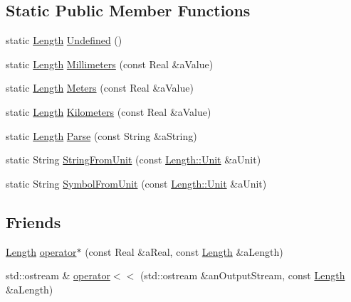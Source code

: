 \subsection*{Static Public Member Functions}
\begin{DoxyCompactItemize}
\item 
static \hyperlink{classlibrary_1_1physics_1_1units_1_1_length}{Length} \hyperlink{classlibrary_1_1physics_1_1units_1_1_length_a5dc80bc442d377701cf052c5bd27bef6}{Undefined} ()
\item 
static \hyperlink{classlibrary_1_1physics_1_1units_1_1_length}{Length} \hyperlink{classlibrary_1_1physics_1_1units_1_1_length_a291b337e409be3e9a13fa697867eb5c8}{Millimeters} (const Real \&a\+Value)
\item 
static \hyperlink{classlibrary_1_1physics_1_1units_1_1_length}{Length} \hyperlink{classlibrary_1_1physics_1_1units_1_1_length_ad523a3737d5c3f23a64588eac83f2148}{Meters} (const Real \&a\+Value)
\item 
static \hyperlink{classlibrary_1_1physics_1_1units_1_1_length}{Length} \hyperlink{classlibrary_1_1physics_1_1units_1_1_length_a28e457b910a96d1eb2bdf661d815478a}{Kilometers} (const Real \&a\+Value)
\item 
static \hyperlink{classlibrary_1_1physics_1_1units_1_1_length}{Length} \hyperlink{classlibrary_1_1physics_1_1units_1_1_length_af4bf5addf6b3936ef7c6cbd3fdca5bb3}{Parse} (const String \&a\+String)
\item 
static String \hyperlink{classlibrary_1_1physics_1_1units_1_1_length_a2e5796c1a5f36b168cd0ddaa03381299}{String\+From\+Unit} (const \hyperlink{classlibrary_1_1physics_1_1units_1_1_length_a3b8b39cd245cf6b19dc34459baeccb18}{Length\+::\+Unit} \&a\+Unit)
\item 
static String \hyperlink{classlibrary_1_1physics_1_1units_1_1_length_a645313cc92b2863704275f9e8b3f8879}{Symbol\+From\+Unit} (const \hyperlink{classlibrary_1_1physics_1_1units_1_1_length_a3b8b39cd245cf6b19dc34459baeccb18}{Length\+::\+Unit} \&a\+Unit)
\end{DoxyCompactItemize}
\subsection*{Friends}
\begin{DoxyCompactItemize}
\item 
\hyperlink{classlibrary_1_1physics_1_1units_1_1_length}{Length} \hyperlink{classlibrary_1_1physics_1_1units_1_1_length_a72059ec2f1e930a0e75a3a808e434363}{operator$\ast$} (const Real \&a\+Real, const \hyperlink{classlibrary_1_1physics_1_1units_1_1_length}{Length} \&a\+Length)
\item 
std\+::ostream \& \hyperlink{classlibrary_1_1physics_1_1units_1_1_length_a95a13170a8d57cb0060eae94520eace4}{operator$<$$<$} (std\+::ostream \&an\+Output\+Stream, const \hyperlink{classlibrary_1_1physics_1_1units_1_1_length}{Length} \&a\+Length)
\end{DoxyCompactItemize}


